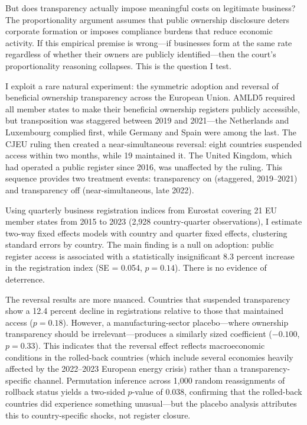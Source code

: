 \documentclass[12pt]{article}
\begin{document}
But does transparency actually impose meaningful costs on legitimate business? The proportionality argument assumes that public ownership disclosure deters corporate formation or imposes compliance burdens that reduce economic activity. If this empirical premise is wrong---if businesses form at the same rate regardless of whether their owners are publicly identified---then the court's proportionality reasoning collapses. This is the question I test.

I exploit a rare natural experiment: the symmetric adoption and reversal of beneficial ownership transparency across the European Union. AMLD5 required all member states to make their beneficial ownership registers publicly accessible, but transposition was staggered between 2019 and 2021---the Netherlands and Luxembourg complied first, while Germany and Spain were among the last. The CJEU ruling then created a near-simultaneous reversal: eight countries suspended access within two months, while 19 maintained it. The United Kingdom, which had operated a public register since 2016, was unaffected by the ruling. This sequence provides two treatment events: transparency on (staggered, 2019--2021) and transparency off (near-simultaneous, late 2022).

Using quarterly business registration indices from Eurostat covering 21 EU member states from 2015 to 2023 (2,928 country-quarter observations), I estimate two-way fixed effects models with country and quarter fixed effects, clustering standard errors by country. The main finding is a null on adoption: public register access is associated with a statistically insignificant 8.3 percent increase in the registration index (SE = 0.054, $p = 0.14$). There is no evidence of deterrence.

The reversal results are more nuanced. Countries that suspended transparency show a 12.4 percent decline in registrations relative to those that maintained access ($p = 0.18$). However, a manufacturing-sector placebo---where ownership transparency should be irrelevant---produces a similarly sized coefficient ($-0.100$, $p = 0.33$). This indicates that the reversal effect reflects macroeconomic conditions in the rolled-back countries (which include several economies heavily affected by the 2022--2023 European energy crisis) rather than a transparency-specific channel. Permutation inference across 1,000 random reassignments of rollback status yields a two-sided $p$-value of 0.038, confirming that the rolled-back countries did experience something unusual---but the placebo analysis attributes this to country-specific shocks, not register closure.
\end{document}
